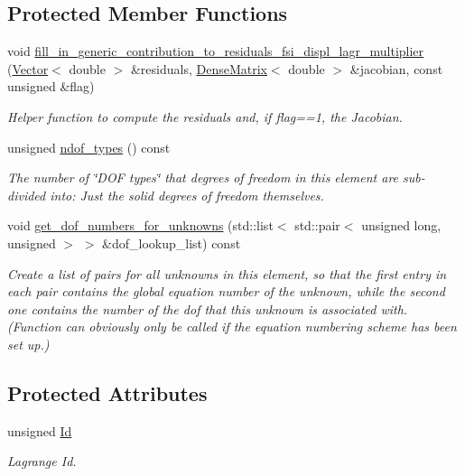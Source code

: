 \subsection*{Protected Member Functions}
\begin{DoxyCompactItemize}
\item 
void \hyperlink{classoomph_1_1FSIImposeDisplacementByLagrangeMultiplierElement_abf26cdce6da0f50ff1169d79d4319c4a}{fill\+\_\+in\+\_\+generic\+\_\+contribution\+\_\+to\+\_\+residuals\+\_\+fsi\+\_\+displ\+\_\+lagr\+\_\+multiplier} (\hyperlink{classoomph_1_1Vector}{Vector}$<$ double $>$ \&residuals, \hyperlink{classoomph_1_1DenseMatrix}{Dense\+Matrix}$<$ double $>$ \&jacobian, const unsigned \&flag)
\begin{DoxyCompactList}\small\item\em Helper function to compute the residuals and, if flag==1, the Jacobian. \end{DoxyCompactList}\item 
unsigned \hyperlink{classoomph_1_1FSIImposeDisplacementByLagrangeMultiplierElement_ad34707237f7a7bdeb3b89cff465ecb67}{ndof\+\_\+types} () const
\begin{DoxyCompactList}\small\item\em The number of \char`\"{}\+D\+O\+F types\char`\"{} that degrees of freedom in this element are sub-\/divided into\+: Just the solid degrees of freedom themselves. \end{DoxyCompactList}\item 
void \hyperlink{classoomph_1_1FSIImposeDisplacementByLagrangeMultiplierElement_a7134be65db436042a327e7e9d49fb507}{get\+\_\+dof\+\_\+numbers\+\_\+for\+\_\+unknowns} (std\+::list$<$ std\+::pair$<$ unsigned long, unsigned $>$ $>$ \&dof\+\_\+lookup\+\_\+list) const
\begin{DoxyCompactList}\small\item\em Create a list of pairs for all unknowns in this element, so that the first entry in each pair contains the global equation number of the unknown, while the second one contains the number of the dof that this unknown is associated with. (Function can obviously only be called if the equation numbering scheme has been set up.) \end{DoxyCompactList}\end{DoxyCompactItemize}
\subsection*{Protected Attributes}
\begin{DoxyCompactItemize}
\item 
unsigned \hyperlink{classoomph_1_1FSIImposeDisplacementByLagrangeMultiplierElement_ae9d988fbbe338d8ccc797428dc9c4674}{Id}
\begin{DoxyCompactList}\small\item\em Lagrange Id. \end{DoxyCompactList}\end{DoxyCompactItemize}
